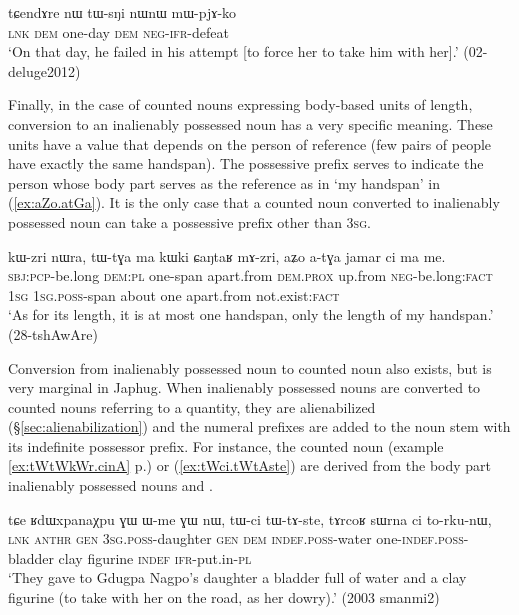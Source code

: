 \begin{exe}
\ex \label{ex:nW.tWsNi}
\gll tɕendɤre nɯ tɯ-sŋi nɯnɯ mɯ-pjɤ-ko \\
\textsc{lnk} \textsc{dem} one-day \textsc{dem} \textsc{neg}-\textsc{ifr}-defeat \\
\glt `On that day, he failed in his attempt [to force her to take him with her].' (02-deluge2012)
\end{exe}

Finally, in the case of counted nouns expressing body-based units of length, conversion to an inalienably possessed noun has a very specific meaning.  These units have a value that depends on the person of reference (few pairs of people have exactly the same handspan). The possessive prefix serves to indicate the person whose body part serves as the reference as in  `my handspan' in (\ref{ex:aZo.atGa}). It is the only case that a counted noun converted to inalienably possessed noun can take a possessive prefix other than \textsc{3sg}.

\begin{exe}
\ex \label{ex:aZo.atGa}
\gll kɯ-zri nɯra, tɯ-tɣa ma kɯki ɕaŋtaʁ mɤ-zri, aʑo a-tɣa jamar ci ma me. \\
 \textsc{sbj}:\textsc{pcp}-be.long \textsc{dem}:\textsc{pl} one-span apart.from \textsc{dem}.\textsc{prox} up.from \textsc{neg}-be.long:\textsc{fact} \textsc{1sg} \textsc{1sg}.\textsc{poss}-span about one apart.from not.exist:\textsc{fact} \\
\glt `As for its length, it is at most one handspan, only the length of my handspan.' (28-tshAwAre)
\end{exe}

Conversion from inalienably possessed noun to counted noun also exists, but is very marginal in Japhug. When inalienably possessed nouns are converted to counted nouns referring to a quantity, they are alienabilized (§\ref{sec:alienabilization}) and the numeral prefixes are added to the noun stem with its indefinite possessor prefix. For instance, the counted noun  (example \ref{ex:tWtWkWr.cinA} p.\pageref{ex:tWtWkWr.cinA}) or  (\ref{ex:tWci.tWtAste}) are derived from the body part inalienably possessed nouns  and . 

\begin{exe}
\ex \label{ex:tWci.tWtAste}
\gll  tɕe ʁdɯxpanaχpu ɣɯ ɯ-me ɣɯ nɯ, tɯ-ci tɯ-tɤ-ste, tɤrcoʁ sɯrna ci to-rku-nɯ, \\
 \textsc{lnk}  \textsc{anthr} \textsc{gen} \textsc{3sg}.\textsc{poss}-daughter \textsc{gen} \textsc{dem} \textsc{indef}.\textsc{poss}-water one-\textsc{indef}.\textsc{poss}-bladder clay figurine \textsc{indef} \textsc{ifr}-put.in-\textsc{pl} \\
\glt `They gave to Gdugpa Nagpo's daughter a bladder full of water and a clay figurine (to take with her on the road, as her dowry).' (2003 smanmi2)
\end{exe}

